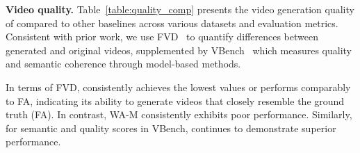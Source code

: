 \noindent\textbf{Video quality.} Table~\ref{table:quality_comp} presents the video generation quality of \sys compared to other baselines across various datasets and evaluation metrics. 
Consistent with prior work, we use FVD~\cite{unterthiner2018fvd} to quantify differences between generated and original videos, supplemented by VBench~\cite{huang2024vbench} which measures quality and semantic coherence through model-based methods.

In terms of FVD, \sys consistently achieves the lowest values or performs comparably to FA, indicating its ability to generate videos that closely resemble the ground truth (FA). In contrast, WA-M consistently exhibits poor performance. Similarly, for semantic and quality scores in VBench, \sys continues to demonstrate superior performance.


\begin{table}[t]
\centering
\begin{minipage}[t]{0.26\textwidth} %
\vspace{0pt} %
\end{minipage}
\end{table}
